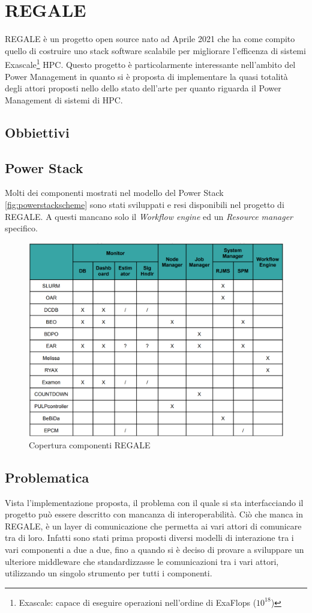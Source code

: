 \chapter{REGALE}
REGALE\cite{REGALE} è un progetto open source nato ad Aprile 2021 che ha come compito quello di costruire uno stack software scalabile per migliorare l'efficenza di sistemi Exascale\footnote{Exascale: capace di eseguire operazioni nell'ordine di ExaFlops ($10^{18}$)} HPC. Questo progetto è particolarmente interessante nell'ambito del Power Management in quanto si è proposta di implementare la quasi totalità degli attori proposti nello dello stato dell'arte per quanto riguarda il Power Management di sistemi di HPC.
\section{Obbiettivi}

\section{Power Stack}
Molti dei componenti mostrati nel modello del Power Stack \ref{fig:powerstackscheme} sono stati sviluppati e resi disponibili nel progetto di REGALE. A questi mancano solo il \emph{Workflow engine} ed un \emph{Resource manager} specifico.
\begin{figure}[H]
    \centering
    \includegraphics[width=\textwidth]{./img/REGALE-components.png}
    \caption{Copertura componenti REGALE}
    \label{fig:regale_cover}
\end{figure}
\section{Problematica}
Vista l'implementazione proposta, il problema con il quale si sta interfacciando il progetto può essere descritto con mancanza di interoperabilità. Ciò che manca in REGALE, è un layer di comunicazione che permetta ai vari attori di comunicare tra di loro. Infatti sono stati prima proposti diversi modelli di interazione tra i vari componenti a due a due, fino a quando si è deciso di provare a sviluppare un ulteriore middleware che standardizzasse le comunicazioni tra i vari attori, utilizzando un singolo strumento per tutti i componenti. 
